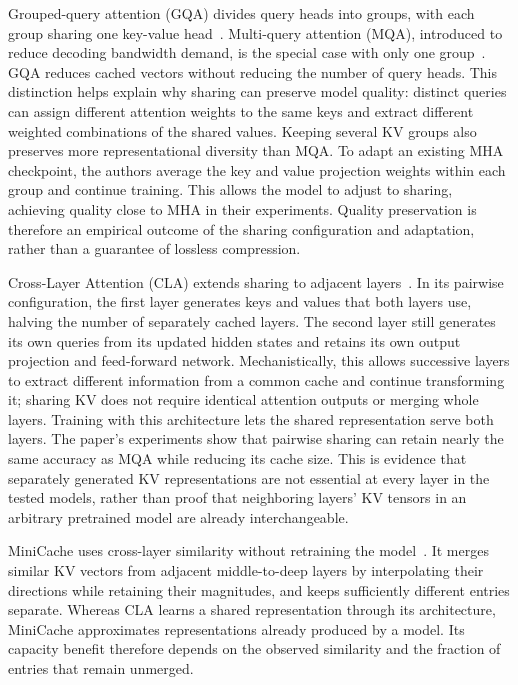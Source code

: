 Grouped-query attention (GQA) divides query heads into groups, with each group sharing one key-value head~\cite{kv_ainslie2023gqa}. Multi-query attention (MQA), introduced to reduce decoding bandwidth demand, is the special case with only one group~\cite{kv_shazeer2019mqa}. GQA reduces cached vectors without reducing the number of query heads. This distinction helps explain why sharing can preserve model quality: distinct queries can assign different attention weights to the same keys and extract different weighted combinations of the shared values. Keeping several KV groups also preserves more representational diversity than MQA. To adapt an existing MHA checkpoint, the authors average the key and value projection weights within each group and continue training. This allows the model to adjust to sharing, achieving quality close to MHA in their experiments. Quality preservation is therefore an empirical outcome of the sharing configuration and adaptation, rather than a guarantee of lossless compression.

Cross-Layer Attention (CLA) extends sharing to adjacent layers~\cite{kv_brandon2024cla}. In its pairwise configuration, the first layer generates keys and values that both layers use, halving the number of separately cached layers. The second layer still generates its own queries from its updated hidden states and retains its own output projection and feed-forward network. Mechanistically, this allows successive layers to extract different information from a common cache and continue transforming it; sharing KV does not require identical attention outputs or merging whole layers. Training with this architecture lets the shared representation serve both layers. The paper's experiments show that pairwise sharing can retain nearly the same accuracy as MQA while reducing its cache size. This is evidence that separately generated KV representations are not essential at every layer in the tested models, rather than proof that neighboring layers' KV tensors in an arbitrary pretrained model are already interchangeable.

MiniCache uses cross-layer similarity without retraining the model~\cite{kv_liu2024minicache}. It merges similar KV vectors from adjacent middle-to-deep layers by interpolating their directions while retaining their magnitudes, and keeps sufficiently different entries separate. Whereas CLA learns a shared representation through its architecture, MiniCache approximates representations already produced by a model. Its capacity benefit therefore depends on the observed similarity and the fraction of entries that remain unmerged.


